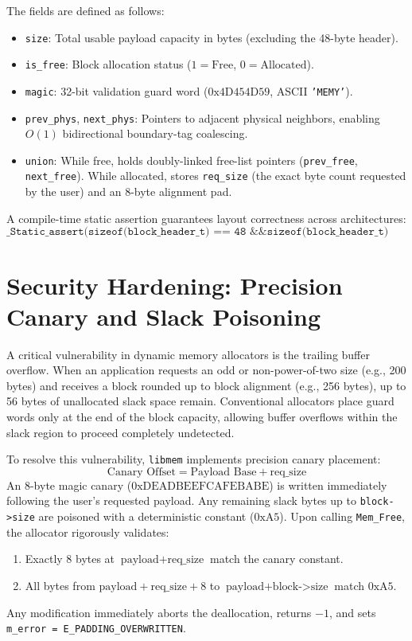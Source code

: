 \documentclass[a4paper,11pt]{report}
\begin{document}
The fields are defined as follows:
\begin{itemize}
    \item \texttt{size}: Total usable payload capacity in bytes (excluding the 48-byte header).
    \item \texttt{is\_free}: Block allocation status ($1 = \text{Free}$, $0 = \text{Allocated}$).
    \item \texttt{magic}: 32-bit validation guard word ($0\text{x4D454D59}$, ASCII \texttt{'MEMY'}).
    \item \texttt{prev\_phys}, \texttt{next\_phys}: Pointers to adjacent physical neighbors, enabling $O(1)$ bidirectional boundary-tag coalescing.
    \item \texttt{union}: While free, holds doubly-linked free-list pointers (\texttt{prev\_free}, \texttt{next\_free}). While allocated, stores \texttt{req\_size} (the exact byte count requested by the user) and an 8-byte alignment pad.
\end{itemize}

A compile-time static assertion guarantees layout correctness across architectures:
\begin{equation}
\texttt{\_Static\_assert(sizeof(block\_header\_t) == 48 \&\& sizeof(block\_header\_t) \% 16 == 0);}
\end{equation}

\section{Security Hardening: Precision Canary and Slack Poisoning}
A critical vulnerability in dynamic memory allocators is the trailing buffer overflow. When an application requests an odd or non-power-of-two size (e.g., 200 bytes) and receives a block rounded up to block alignment (e.g., 256 bytes), up to 56 bytes of unallocated slack space remain. Conventional allocators place guard words only at the end of the block capacity, allowing buffer overflows within the slack region to proceed completely undetected.

To resolve this vulnerability, \texttt{libmem} implements precision canary placement:
\begin{equation}
\text{Canary Offset} = \text{Payload Base} + \text{req\_size}
\end{equation}
An 8-byte magic canary ($0\text{xDEADBEEFCAFEBABE}$) is written immediately following the user's requested payload. Any remaining slack bytes up to \texttt{block->size} are poisoned with a deterministic constant ($0\text{xA5}$). Upon calling \texttt{Mem\_Free}, the allocator rigorously validates:
\begin{enumerate}
    \item Exactly 8 bytes at $\text{payload} + \text{req\_size}$ match the canary constant.
    \item All bytes from $\text{payload} + \text{req\_size} + 8$ to $\text{payload} + \text{block->size}$ match $0\text{xA5}$.
\end{enumerate}
Any modification immediately aborts the deallocation, returns $-1$, and sets \texttt{m\_error = E\_PADDING\_OVERWRITTEN}.
\end{document}

